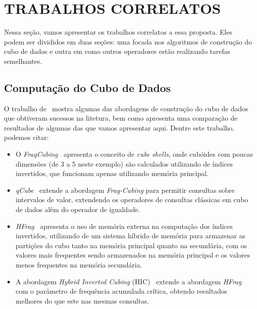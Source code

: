 
\chapter{TRABALHOS CORRELATOS}
\label{ch:corr}

Nessa seção, vamos apresentar os trabalhos correlatos a essa proposta. Eles podem ser divididos em duas seções: uma focada nos algoritmos de construção do cubo de dados e outra em como outros operadores estão realizando tarefas semelhantes.

\section{Computação do Cubo de Dados}
\label{ch:corr:cube}

O trabalho de~\cite{silva:2015:abordagensParaCubo} mostra algumas das abordagens de construção do cubo de dados que obtiveram sucessos na litetura, bem como apresenta uma comparação de resultados de algumas das que vamos apresentar aqui. Dentre este trabalho, podemos citar:

\begin{itemize}
	\item O \textit{FragCubing}~\cite{liHighDimensionalOLAPMinimal2004} apresenta o conceito de \textit{cube shells}, onde cubóides com poucas dimensões (de 3 a 5 neste exemplo) são calculados utilizando de índices invertidos, que funcionam apenas utilizando memória principal.
	\item \textit{qCube}~\cite{silvaQCubeEfficientIntegration2013} extende a abordagem \textit{Frag-Cubing} para permitir consultas sobre intervalos de valor, extendendo os operadores de consultas clássicas em cubo de dados além do operador de igualdade.
	\item \textit{HFrag}~\cite{silvaHybridMemoryData2015} apresenta o uso de memória externa na computação dos índices invertidos, utilizando de um sistema híbrido de memória para armazenar as partições do cubo tanto na memória principal quanto na secundária, com os valores mais frequentes sendo armazenados na memória principal e os valores menos frequentes na memória secundária.

	\item A abordagem \textit{Hybrid Inverted Cubing} (HIC)~\cite{silvaComputingBIGData2016} extende a abordagem \textit{HFrag} com o parâmetro de frequência acumulada crítica, obtendo resultados melhores do que este nas mesmas consultas.
\end{itemize}

